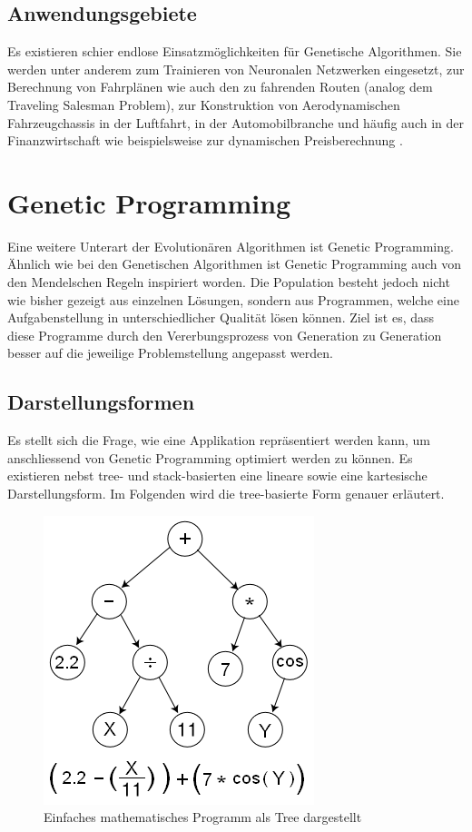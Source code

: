 \subsection{Anwendungsgebiete}
Es existieren schier endlose Einsatzmöglichkeiten für Genetische Algorithmen. Sie werden unter anderem
zum Trainieren von Neuronalen Netzwerken eingesetzt, zur Berechnung von Fahrplänen wie auch den zu fahrenden
Routen (analog dem Traveling Salesman Problem), zur Konstruktion von Aerodynamischen Fahrzeugchassis in
der Luftfahrt, in der Automobilbranche und häufig auch in der Finanzwirtschaft wie beispielsweise
zur dynamischen Preisberechnung \cite{Tut}.

\section{Genetic Programming}
Eine weitere Unterart der Evolutionären Algorithmen ist Genetic Programming. Ähnlich wie
bei den Genetischen Algorithmen ist Genetic Programming auch von den Mendelschen Regeln
inspiriert worden. Die Population besteht jedoch nicht wie bisher gezeigt aus einzelnen
Lösungen, sondern aus Programmen, welche eine Aufgabenstellung in unterschiedlicher
Qualität lösen können. Ziel ist es, dass diese Programme durch den Vererbungsprozess
von Generation zu Generation besser auf die jeweilige Problemstellung angepasst werden.
\cite{GenGP}

\subsection{Darstellungsformen}
Es stellt sich die Frage, wie eine Applikation repräsentiert werden kann, um anschliessend von
Genetic Programming optimiert werden zu können. Es existieren nebst tree- und stack-basierten
eine lineare sowie eine kartesische Darstellungsform. Im Folgenden wird die tree-basierte Form
genauer erläutert.

\begin{figure}[h!]
  \centering
  \includegraphics[scale=0.5]{resources/genetic_program_tree.png}
  \caption{Einfaches mathematisches Programm als Tree dargestellt \cite{Wiki01}}
  \label{fig:gp_tree}
\end{figure}

